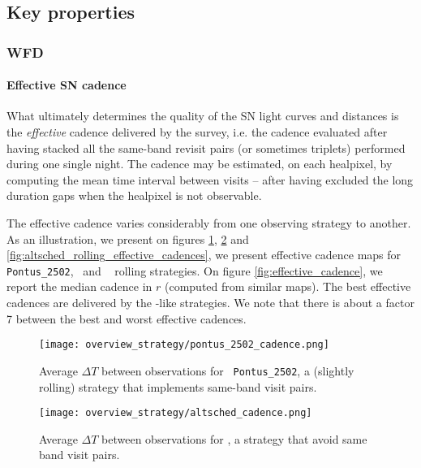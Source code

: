 \subsection{Key properties}

\subsubsection {WFD}
\label{sec:wfd_cadence_key_properties}

\paragraph{Effective SN cadence} What ultimately determines the quality of the SN light curves
and distances is the {\em effective} cadence delivered by the survey,
i.e.  the cadence evaluated after having stacked all the same-band
revisit pairs (or sometimes triplets) performed during one single night. The cadence may be estimated, on each
healpixel, by computing the mean time interval between visits -- after
having excluded the long duration gaps when the healpixel is not
observable.

The effective cadence varies considerably from one observing strategy
to another.  As an illustration, we present on figures
\ref{fig:pontus_2502_effective_cadences},
\ref{fig:altsched_effective_cadences} and
\ref{fig:altsched_rolling_effective_cadences}, we present effective
cadence maps for {\tt Pontus\_2502}, \altsched~and \altsched~
rolling strategies.  On figure \ref{fig:effective_cadence}, we
report the median cadence in $r$ (computed from similar maps).  The
best effective cadences are delivered by the \altsched-like
strategies. We note that there is about a factor 7 between the best
and worst effective cadences.

\begin{figure}
  \begin{center}
    \texttt{[image: overview\_strategy/pontus\_2502\_cadence.png]}
    \caption{Average $\Delta T$ between observations for {\tt
        Pontus\_2502}, a (slightly rolling) strategy that implements
      same-band visit pairs. }
    \label{fig:pontus_2502_effective_cadences}
  \end{center}
\end{figure}


\begin{figure}
  \begin{center}
    \texttt{[image: overview\_strategy/altsched\_cadence.png]}
    \caption{Average $\Delta T$ between observations for \altsched, a strategy that avoid same band visit pairs.}
    \label{fig:altsched_effective_cadences}
  \end{center}
\end{figure}


